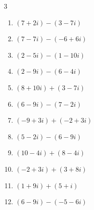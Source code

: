 \begin{multicols}{3}
\begin{enumerate}
        \phantom{$\displaystyle =-1+i$}

  \item $\displaystyle (7+2i) - (3-7i)$

        \phantom{$\displaystyle =4+9i$}

  \item $\displaystyle (7-7i) - (-6+6i)$

        \phantom{$\displaystyle =13-13i$}

  \item $\displaystyle (2-5i) - (1-10i)$

        \phantom{$\displaystyle =1+5i$}

  \item $\displaystyle (2-9i) - (6-4i)$

        \phantom{$\displaystyle =-4-5i$}

  \item $\displaystyle (8+10i) + (3-7i)$

        \phantom{$\displaystyle =11+3i$}

  \item $\displaystyle (6-9i) - (7-2i)$

        \phantom{$\displaystyle =-1-7i$}

  \item $\displaystyle (-9+3i) + (-2+3i)$

        \phantom{$\displaystyle =-11+6i$}

  \item $\displaystyle (5-2i) - (6-9i)$

        \phantom{$\displaystyle =-1+7i$}

  \item $\displaystyle (10-4i) + (8-4i)$

        \phantom{$\displaystyle =18-8i$}

  \item $\displaystyle (-2+3i) + (3+8i)$

        \phantom{$\displaystyle =1+11i$}

  \item $\displaystyle (1+9i) + (5+i)$

        \phantom{$\displaystyle =6+10i$}

\columnbreak %

\resetques

  \item $\displaystyle (6-9i) - (-5-6i)$

        \phantom{$\displaystyle =11-3i$}


\end{enumerate}
\end{multicols}
